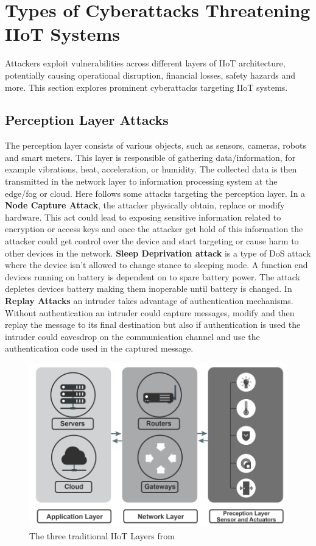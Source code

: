 \documentclass[article,a4paper]{IEEEtran}
\begin{document}
\section{Types of Cyberattacks Threatening IIoT Systems}
Attackers exploit vulnerabilities across different layers of IIoT architecture, potentially causing operational disruption, financial losses, safety hazards and more. This section explores prominent cyberattacks targeting IIoT systems. 
\subsection{Perception Layer Attacks}
The perception layer consists of various objects, such as sensors, cameras, robots and smart meters. This layer is responsible of gathering data/information, for example vibrations, heat, acceleration, or humidity. The collected data is then transmitted in the network layer to information processing system at the edge/fog or cloud. Here follows some attacks targeting the perception layer.
\newline\newline
In a \textbf{Node Capture Attack}, the attacker physically obtain, replace or modify hardware. This act could lead to exposing sensitive information related to encryption or access keys and once the attacker get hold of this information the attacker could get control over the device and start targeting or cause harm to other devices in the network. 
\newline
\textbf{Sleep Deprivation attack} is a type of DoS attack where the device isn't allowed to change stance to sleeping mode. A function end devices running on battery is dependent on to spare battery power. The attack depletes devices battery making them inoperable until battery is changed. 
\newline
In \textbf{Replay Attacks} an intruder takes advantage of authentication mechanisms. Without authentication an intruder could capture messages, modify and then replay the message to its final destination but also if authentication is used the intruder could eavesdrop on the communication channel and use the authentication code used in the captured message. 
\begin{figure}
    \includegraphics[width=\columnwidth]{LayersIIoT.png}
    \caption{ The three traditional IIoT Layers from \cite{SurveySecurity} }
    \label{fig1: IIoT layers }
\end{figure}
\end{document}
